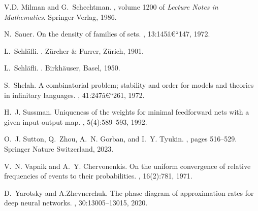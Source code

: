 \documentclass{elsarticle}
\begin{document}
\begin{thebibliography}{10}
V.D. Milman and G.~Schechtman.
, volume
  1200 of {\em Lecture Notes in Mathematics}.
\newblock Springer-Verlag, 1986.

N.~Sauer.
\newblock On the density of families of sets.
, 13:145â€“147, 1972.

L.~Schl\"{a}fli.
.
\newblock Z\"{u}rcher \& Furrer, Z\"{u}rich, 1901.

L.~Schl\"{a}fli.
.
\newblock Birkh\"{a}user, Basel, 1950.

S.~Shelah.
\newblock A combinatorial problem; stability and order for models and theories
  in infinitary languages.
, 41:247â€“261, 1972.

H.~J. Sussman.
\newblock Uniqueness of the weights for minimal feedforward nets with a given
  input-output map.
, 5(4):589--593, 1992.

O.~J. Sutton, Q.~Zhou, A.~N. Gorban, and I.~Y. Tyukin.
,
  pages 516--529.
\newblock Springer Nature Switzerland, 2023.

V.~N. Vapnik and A.~Y. Chervonenkis.
\newblock On the uniform convergence of relative frequencies of events to their
  probabilities.
, 16(2):781, 1971.

D.~Yarotsky and A.Zhevnerchuk.
\newblock The phase diagram of approximation rates for deep neural networks.
,
  30:13005--13015, 2020.

\end{thebibliography}
\end{document}
